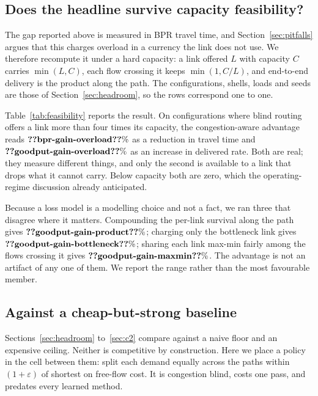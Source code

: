 \documentclass[journal]{IEEEtran}
\begin{document}


\subsection{Does the headline survive capacity feasibility?}\label{sec:feasible}

The gap reported above is measured in BPR travel time, and Section~\ref{sec:pitfalls} argues that
this charges overload in a currency the link does not use. We therefore recompute it under a hard
capacity: a link offered $L$ with capacity $C$ carries $\min(L,C)$, each flow crossing it keeps
$\min(1,C/L)$, and end-to-end delivery is the product along the path. The configurations, shells,
loads and seeds are those of Section~\ref{sec:headroom}, so the rows correspond one to one.

Table~\ref{tab:feasibility} reports the result. On configurations where blind routing offers a link
more than four times its capacity, the
congestion-aware advantage reads $\clm{bpr-gain-overload}\%$ as a reduction in travel time and $\clm{goodput-gain-overload}\%$ as an increase in delivered rate. Both are real; they measure different things, and only the second is available
to a link that drops what it cannot carry. Below capacity both are zero, which the operating-regime
discussion already anticipated.

Because a loss model is a modelling choice and not a fact, we ran three that disagree where it
matters. Compounding the per-link survival along the path gives $\clm{goodput-gain-product}\%$; charging only the bottleneck link gives $\clm{goodput-gain-bottleneck}\%$; sharing each link max-min fairly among the flows crossing it gives $\clm{goodput-gain-maxmin}\%$. The advantage is not an artifact of any one of them. We report the range rather than the
most favourable member.

\subsection{Against a cheap-but-strong baseline}\label{sec:vs-blind}

Sections~\ref{sec:headroom} to~\ref{sec:c2} compare against a naive floor and an expensive ceiling.
Neither is competitive by construction. Here we place a policy in the cell between them: split each
demand equally across the paths within $(1+\varepsilon)$ of shortest on free-flow cost. It is
congestion blind, costs one pass, and predates every learned method.
\end{document}
